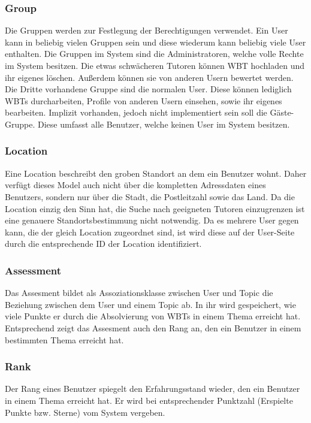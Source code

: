 \subsubsection{Group}
Die Gruppen werden zur Festlegung der Berechtigungen verwendet. Ein User
kann in beliebig vielen Gruppen sein und diese wiederum kann beliebig viele User
enthalten. Die Gruppen im System sind die Administratoren, welche volle Rechte
im System besitzen. Die etwas schwächeren Tutoren können WBT hochladen und ihr
eigenes löschen. Außerdem können sie von anderen Usern bewertet werden. Die
Dritte vorhandene Gruppe sind die normalen User. Diese können lediglich WBTs
durcharbeiten, Profile von anderen Usern einsehen, sowie ihr eigenes bearbeiten.
Implizit vorhanden, jedoch nicht implementiert sein soll die Gäste-Gruppe. Diese
umfasst alle Benutzer, welche keinen User im System besitzen.

\subsubsection{Location}
Eine Location beschreibt den groben Standort an dem ein Benutzer wohnt. Daher
verfügt dieses Model auch nicht über die kompletten Adressdaten eines Benutzers,
sondern nur über die Stadt, die Postleitzahl sowie das Land. Da die Location
einzig den Sinn hat, die Suche nach geeigneten Tutoren einzugrenzen ist eine
genauere Standortsbestimmung nicht notwendig. Da es mehrere User gegen kann, die
der gleich Location zugeordnet sind, ist wird diese auf der User-Seite durch die
entsprechende ID der Location identifiziert. 

\subsubsection{Assessment}
Das Assesment bildet als Assoziationsklasse zwischen User und Topic die
Beziehung zwischen dem User und einem Topic ab. In ihr wird gespeichert, wie
viele Punkte er durch die Absolvierung von WBTs in einem Thema erreicht hat.
Entsprechend zeigt das Assesment auch den Rang an, den ein Benutzer in einem
bestimmten Thema erreicht hat.

\subsubsection{Rank}
Der Rang eines Benutzer spiegelt den Erfahrungsstand wieder, den ein Benutzer in
einem Thema erreicht hat. Er wird bei entsprechender Punktzahl (Erspielte Punkte
bzw. Sterne) vom System vergeben.

